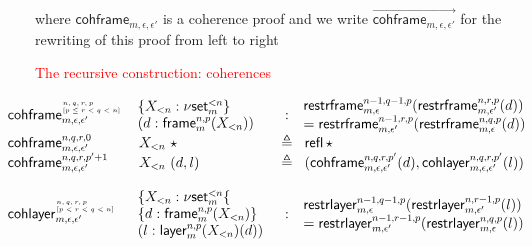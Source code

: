 \documentclass[12pt,landscape]{article}
\newcommand{\refl}[1]{\mathsf{refl}\,{#1}}
\newcommand{\defeq}{\triangleq}
\newcommand{\partialcubset}[2]{\mathsf{\nu set}_{#1}^{<#2}}
\newcommand{\mybox}[1]{\mathsf{frame}_{#1}}
\newcommand{\mylayer}[1]{\mathsf{layer}_{#1}}
\newcommand{\unitpoint}{\star}
\newcommand{\downbox}[2]{\mathsf{restrframe}_{#1,#2}}
\newcommand{\downlayer}[2]{\mathsf{restrlayer}_{#1,#2}}
\newcommand{\cohbox}[2]{\mathsf{cohframe}_{#1,#2}}
\newcommand{\cohlayer}[2]{\mathsf{cohlayer}_{#1,#2}}
\begin{document}
\begin{LARGE}
\begin{sf}
\noindent where $\cohbox{m}{\epsilon,\epsilon'}$ is a coherence proof and we
write $\overrightarrow{\cohbox{m}{\epsilon,\epsilon'}}$ for the
  rewriting of this proof from left to right

\newpage

\begin{center}
\textcolor{red}{\huge The recursive construction: coherences}
\end{center}

$$
\begin{large}\hspace{-1cm}
\begin{array}{llcl}
\cohbox{m}{\epsilon,\epsilon'}^{\!\!\!\tiny\begin{array}{l}n,q,r,p\\\mbox{}[p \leq r < q < n]\end{array}} & \!\!\!\begin{array}{l}\{X_{<n}:\partialcubset{m}{n}\}\\(d:\mybox{m}^{n,p}(X_{<n}))\end{array}& : & \!\!\!\begin{array}{ll}\downbox{m}{\epsilon}^{n-1,q-1,p}(\downbox{m}{\epsilon'}^{n,r,p}(d)) \\ = \downbox{m}{\epsilon'}^{n-1,r,p}(\downbox{m}{\epsilon}^{n,q,p}(d))\end{array}\\
\cohbox{m}{\epsilon,\epsilon'}^{n,q,r,0} & X_{<n}~\unitpoint & \defeq & \refl{\unitpoint}\\
\cohbox{m}{\epsilon,\epsilon'}^{n,q,r,p'+1} & X_{<n}~(d,l) & \defeq & (\cohbox{m}{\epsilon,\epsilon'}^{n,q,r,p'}(d),\cohlayer{m}{\epsilon,\epsilon'}^{n,q,r,p'}(l))\\
\\
\cohlayer{m}{\epsilon,\epsilon'}^{\!\!\!\tiny\begin{array}{l}n,q,r,p\\\mbox{}[p < r < q < n]\end{array}} & \!\!\!\begin{array}{l}\{X_{<n}:\partialcubset{m}{n}\{\\\{d:\mybox{m}^{n,p}(X_{<n})\}\\(l:\mylayer{m}^{n,p}(X_{<n})(d))\end{array}& : & \!\!\!\begin{array}{ll}\downlayer{m}{\epsilon}^{n-1,q-1,p}(\downlayer{m}{\epsilon'}^{n,r-1,p}(l)) \\ = \downlayer{m}{\epsilon'}^{n-1,r-1,p}(\downlayer{m}{\epsilon}^{n,q,p}(l))\end{array}\\

\end{array}
\end{large}$$
\end{sf}
\end{LARGE}
\end{document}
